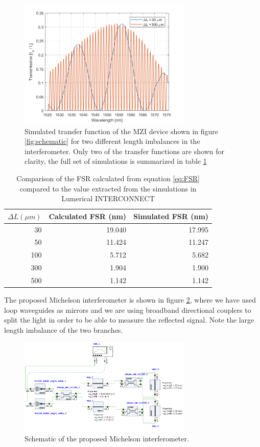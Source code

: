 \documentclass[journal]{IEEEtran}
\begin{document}
\begin{figure}[t!]
  \centering
  \includegraphics[width = 3.25in]{fig/MZI_length_variation.png}
  \caption{Simulated transfer function of the MZI device shown in figure \ref{fig:schematic} for two different length imbalances in the interferometer. Only two of the transfer functions are shown for clarity, the full set of simulations is summarized in table \ref{tab:MZI}}
  \label{fig:deltaL}
\end{figure}



\begin{table}
\centering
\begin{tabular}{ r | r | r }
  \hline
  $\Delta L (\mu m)$ & Calculated FSR (nm) & Simulated FSR (nm) \\
  \hline
  30                 & 19.040              & 17.995 \\
  50                 & 11.424              & 11.247 \\
  100                & 5.712               & 5.682 \\
  300                & 1.904               & 1.900 \\
  500                & 1.142               & 1.142 \\
\end{tabular}
\caption{Comparison of the FSR calculated from equation \ref{eq:FSR} compared to the value extracted from the simulations in Lumerical INTERCONNECT}
\label{tab:MZI}
\end{table}

The proposed Michelson interferometer is shown in figure \ref{fig:mich-scheme}, where we have used loop waveguides as mirrors and we are using broadband directional couplers to split the light in order to be able to measure the reflected signal. Note the large length imbalance of the two branches.

\begin{figure}[t!]
  \centering
  \includegraphics[width = 3.25in]{fig/Michaelson_schematic.png}
  \caption{Schematic of the proposed Michelson interferometer.}
  \label{fig:mich-scheme}
\end{figure}
\end{document}
